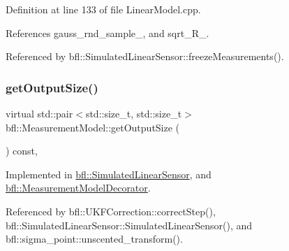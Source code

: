 Definition at line 133 of file Linear\+Model.\+cpp.



References gauss\+\_\+rnd\+\_\+sample\+\_\+, and sqrt\+\_\+\+R\+\_\+.



Referenced by bfl\+::\+Simulated\+Linear\+Sensor\+::freeze\+Measurements().

\mbox{\label{classbfl_1_1MeasurementModel_a6cca2022b576c9dbb61e73b83a10c6ee}} 
\subsubsection{\texorpdfstring{get\+Output\+Size()}{getOutputSize()}}
{\footnotesize\ttfamily virtual std\+::pair$<$std\+::size\+\_\+t, std\+::size\+\_\+t$>$ bfl\+::\+Measurement\+Model\+::get\+Output\+Size (\begin{DoxyParamCaption}{ }\end{DoxyParamCaption}) const\hspace{0.3cm}{\ttfamily [pure virtual]}, {\ttfamily [inherited]}}



Implemented in \mbox{\hyperlink{classbfl_1_1SimulatedLinearSensor_a00e869da2b16b5ead1d76a7b32e9fc4b}{bfl\+::\+Simulated\+Linear\+Sensor}}, and \mbox{\hyperlink{classbfl_1_1MeasurementModelDecorator_a9522d1549c62f55a59401f6fa53421e8}{bfl\+::\+Measurement\+Model\+Decorator}}.



Referenced by bfl\+::\+U\+K\+F\+Correction\+::correct\+Step(), bfl\+::\+Simulated\+Linear\+Sensor\+::\+Simulated\+Linear\+Sensor(), and bfl\+::sigma\+\_\+point\+::unscented\+\_\+transform().

\mbox{\label{classbfl_1_1LinearMeasurementModel_a12485b4b6d511e97e338a4db6861b277}} 
